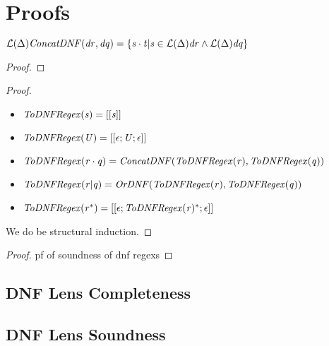 \section{Proofs}



\begin{lemma}
$\mathcal{L}{}(\Delta){\mathit{ConcatDNF}(\mathit{dr},\mathit{dq})}=
\{\mathit{s}\cdot\mathit{t}|\mathit{s}\in\mathcal{L}{}(\Delta){\mathit{dr}}\wedge\mathcal{L}{}(\Delta){\mathit{dq}}\}$
\begin{proof}
\end{proof}
\end{lemma}

\dnfrc*
\begin{proof}
\begin{definition}\leavevmode
\begin{itemize}
\item $\mathit{ToDNFRegex}(\mathit{s})=[[\mathit{s}]]$
\item $\mathit{ToDNFRegex}(\mathit{U})=[[\epsilon;\mathit{U};\epsilon]]$
\item $\mathit{ToDNFRegex}(\mathit{r}\cdot\mathit{q})=\mathit{ConcatDNF}(\mathit{ToDNFRegex}(\mathit{r}),\mathit{ToDNFRegex}(\mathit{q}))$
\item $\mathit{ToDNFRegex}(\mathit{r}|\mathit{q})=\mathit{OrDNF}(\mathit{ToDNFRegex}(\mathit{r}),\mathit{ToDNFRegex}(\mathit{q}))$
\item $\mathit{ToDNFRegex}(\mathit{r}^*)=[[\epsilon;\mathit{ToDNFRegex}(\mathit{r})^*;\epsilon]]$
\end{itemize}
\end{definition}
We do be structural induction.
\end{proof}

\dnfrs*
\begin{proof}
pf of soundness of dnf regexs
\end{proof}

\subsection{DNF Lens Completeness}
\dnflc*

\subsection{DNF Lens Soundness}

